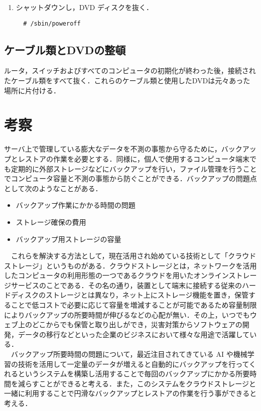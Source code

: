 \documentclass[a4j,titlepage]{jarticle}
\begin{document}
\begin{enumerate}
\begin{enumerate}
    \item シャットダウンし，DVD ディスクを抜く．

  \begin{center}
    \begin{screen}
\begin{verbatim}
  # /sbin/poweroff 
\end{verbatim}
    \end{screen}
    \end{center}

\end{enumerate}

\subsection{ケーブル類とDVDの整頓}
ルータ，スイッチおよびすべてのコンピュータの初期化が終わった後，接続されたケーブル類をすべて抜く．これらのケーブル類と使用したDVDは元々あった場所に片付ける．

\section{考察}
サーバ上で管理している膨大なデータを不測の事態から守るために，バックアップとレストアの作業を必要とする．同様に，個人で使用するコンピュータ端末でも定期的に外部ストレージなどにバックアップを行い，ファイル管理を行うことでコンピュータ容量と不測の事態から防ぐことができる．バックアップの問題点として次のようなことがある．

\begin{itemize}
\item バックアップ作業にかかる時間の問題

\item ストレージ確保の費用
 
\item バックアップ用ストレージの容量

\end{itemize}

　これらを解決する方法として，現在活用され始めている技術として「クラウドストレージ」というものがある．クラウドストレージとは，ネットワークを活用したコンピュータの利用形態の一つであるクラウドを用いたオンラインストレージサービスのことである．その名の通り，装置として端末に接続する従来のハードディスクのストレージとは異なり，ネット上にストレージ機能を置き，保管することで低コストで必要に応じて容量を増減することが可能であるため容量制限によりバックアップの所要時間が伸びるなどの心配が無い．その上，いつでもウェブ上のどこからでも保管と取り出しができ，災害対策からソフトウェアの開発，データの移行などといった企業のビジネスにおいて様々な用途で活躍している．\\
　バックアップ所要時間の問題について，最近注目されてきている AI や機械学習の技術を活用して一定量のデータが増えると自動的にバックアップを行ってくれるというシステムを構築し活用することで毎回のバックアップにかかる所要時間を減らすことができると考える．また，このシステムをクラウドストレージと一緒に利用することで円滑なバックアップとレストアの作業を行う事ができると考える．


\end{enumerate}
\end{document}
